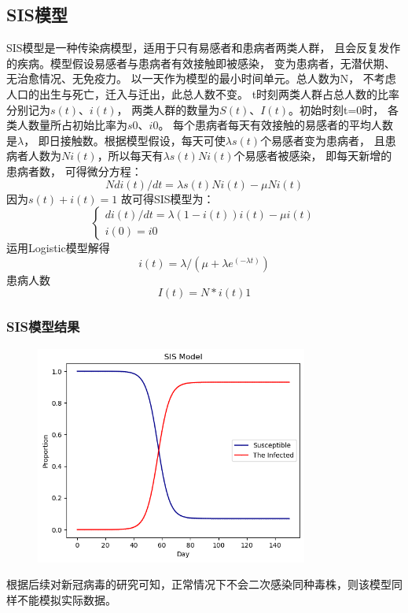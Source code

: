 \documentclass{article}
\begin{document}
\subsection*{SIS模型}
SIS模型是一种传染病模型，适用于只有易感者和患病者两类人群，
且会反复发作的疾病。模型假设易感者与患病者有效接触即被感染，
变为患病者，无潜伏期、无治愈情况、无免疫力。
以一天作为模型的最小时间单元。总人数为N，
不考虑人口的出生与死亡，迁入与迁出，此总人数不变。
t时刻两类人群占总人数的比率分别记为$s(t)$、$i(t)$，
两类人群的数量为$S(t)$、$I(t)$。初始时刻t=0时，
各类人数量所占初始比率为$s0$、$i0$。
每个患病者每天有效接触的易感者的平均人数是$\lambda$，
即日接触数。根据模型假设，每天可使$\lambda s(t)$个易感者变为患病者，
且患病者人数为$Ni(t)$，所以每天有$\lambda s(t)Ni(t)$个易感者被感染，
即每天新增的患病者数，
可得微分方程：$$Ndi(t)/dt=\lambda s(t)Ni(t)-\mu Ni(t)$$
因为$s(t)+i(t)=1$
故可得SIS模型为：$$\begin{cases}
    di(t)/dt=\lambda (1-i(t))i(t)-\mu i(t)\\
    i(0)=i0
\end{cases}$$
运用Logistic模型解得$$i(t)=\lambda /(\mu +\lambda e^(-\lambda t))$$患病人数$$I(t)=N*i(t)1$$

\subsubsection*{SIS模型结果}
\begin{figure}[htbp]
    \centering
	\includegraphics[width=0.8\textwidth]{./img/2.png}
    \caption*{}

\end{figure}

根据后续对新冠病毒的研究可知，正常情况下不会二次感染同种毒株，则该模型同样不能模拟实际数据。
\end{document}
